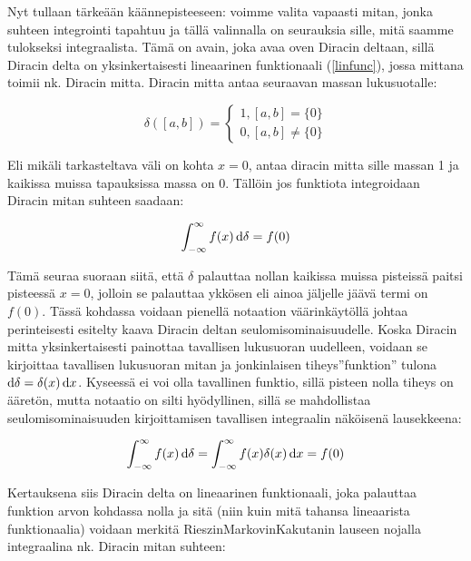 \documentclass[../johdoksia.tex]{subfiles}
\begin{document}
	Nyt tullaan tärkeään käännepisteeseen: voimme valita vapaasti mitan, jonka suhteen integrointi tapahtuu ja tällä valinnalla on seurauksia sille, mitä saamme tulokseksi integraalista. Tämä on avain, joka avaa oven Diracin deltaan, sillä Diracin delta on yksinkertaisesti lineaarinen funktionaali (\ref{linfunc}), jossa mittana toimii nk. Diracin mitta. Diracin mitta antaa seuraavan massan lukusuotalle:
	
	\begin{equation*}
		\delta([a, b]) =
		\begin{cases}
			1, [a, b] = \{0\} \\
			0, [a, b] \neq \{0\}
		\end{cases}
	\end{equation*}

	Eli mikäli tarkasteltava väli on kohta $x = 0$, antaa diracin mitta sille massan 1 ja kaikissa muissa tapauksissa massa on 0. Tällöin jos funktiota integroidaan Diracin mitan suhteen saadaan:
	
	\begin{equation}
		\int_{-\infty}^{\infty}f(x)\odif{\delta} = f(0) 
	\end{equation}

	Tämä seuraa suoraan siitä, että $\delta$ palauttaa nollan kaikissa muissa pisteissä paitsi pisteessä $x = 0$, jolloin se palauttaa ykkösen eli ainoa jäljelle jäävä termi on $f(0)$. Tässä kohdassa voidaan pienellä notaation väärinkäytöllä johtaa perinteisesti esitelty kaava Diracin deltan seulomisominaisuudelle. Koska Diracin mitta yksinkertaisesti painottaa tavallisen lukusuoran uudelleen, voidaan se kirjoittaa tavallisen lukusuoran mitan ja jonkinlaisen tiheys''funktion'' tulona $\odif{\delta} = \delta(x)\odif{x}$. Kyseessä ei voi olla tavallinen funktio, sillä pisteen nolla tiheys on ääretön, mutta notaatio on silti hyödyllinen, sillä se mahdollistaa seulomisominaisuuden kirjoittamisen tavallisen integraalin näköisenä lausekkeena:
	
	\begin{equation*}
		\int_{-\infty}^{\infty}f(x)\odif{\delta} = \int_{-\infty}^{\infty}f(x)\delta(x)\odif{x} = f(0)
	\end{equation*}

	Kertauksena siis Diracin delta on lineaarinen funktionaali, joka palauttaa funktion arvon kohdassa nolla ja sitä (niin kuin mitä tahansa lineaarista funktionaalia) voidaan merkitä Rieszin\textendash Markovin\textendash Kakutanin lauseen nojalla integraalina nk. Diracin mitan suhteen:
	
\end{document}
